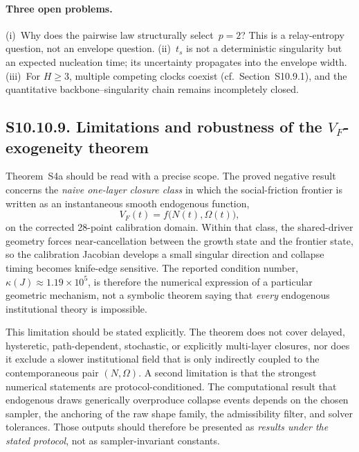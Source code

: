 \documentclass[11pt]{article}
\begin{document}
\paragraph{Three open problems.}
(i)~Why does the pairwise law structurally select~$p=2$?  This is a
relay-entropy question, not an envelope question.
(ii)~$t_s$ is not a deterministic singularity but an expected
nucleation time; its uncertainty propagates into the envelope width.
(iii)~For $H\ge 3$, multiple competing clocks coexist (cf.\
Section~S10.9.1), and the quantitative backbone--singularity chain
remains incompletely closed.


\subsection*{S10.10.9. Limitations and robustness of the $V_F$-exogeneity theorem}
\label{sec:S10_10_9_vf_limitations}

Theorem~S4a should be read with a precise scope.
The proved negative result concerns the \emph{naive one-layer closure class}
in which the social-friction frontier is written as an instantaneous smooth
endogenous function,
\[
V_F(t)=f\!\bigl(N(t),\Omega(t)\bigr),
\]
on the corrected 28-point calibration domain.
Within that class, the shared-driver geometry forces near-cancellation between
the growth state and the frontier state, so the calibration Jacobian develops a
small singular direction and collapse timing becomes knife-edge sensitive.
The reported condition number,
$\kappa(J)\approx 1.19\times 10^5$,
is therefore the numerical expression of a particular geometric mechanism,
not a symbolic theorem saying that \emph{every} endogenous institutional theory
is impossible.

This limitation should be stated explicitly.
The theorem does not cover delayed, hysteretic, path-dependent, stochastic, or
explicitly multi-layer closures, nor does it exclude a slower institutional
field that is only indirectly coupled to the contemporaneous pair $(N,\Omega)$.
A second limitation is that the strongest numerical statements are
protocol-conditioned.
The computational result that endogenous draws generically overproduce collapse
events depends on the chosen sampler, the anchoring of the raw shape family, the
admissibility filter, and solver tolerances.
Those outputs should therefore be presented as \emph{results under the stated
protocol}, not as sampler-invariant constants.
\end{document}
